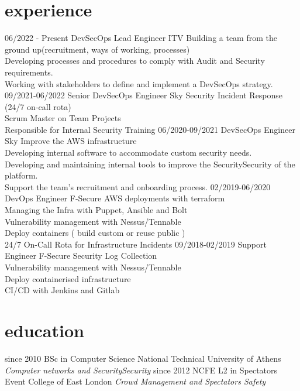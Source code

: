 \documentclass[]{twentysecondcv}
\begin{document}
\section{experience}
\begin{twenty}
  \twentyitem
    {06/2022 - Present}
    {DevSecOps Lead Engineer}
    {ITV}
    {Building a team from the ground up(recruitment, ways of working, processes)\\
    Developing processes and procedures to comply with Audit and Security requirements.\\
    Working with stakeholders to define and implement a DevSecOps strategy.    }
  \twentyitem
    {09/2021-06/2022}
    {Senior DevSecOps Engineer}
    {Sky}
    {Security Incident Response (24/7 on-call rota)\\
    Scrum Master on Team Projects\\
    Responsible for Internal Security Training    }
  \twentyitem
    {06/2020-09/2021}
    {DevSecOps Engineer}
    {Sky}
    {    Improve the AWS infrastructure\\
    Developing internal software to accommodate custom security needs.\\
    Developing and maintaining internal tools to improve the SecuritySecurity of the platform.\\
    Support the team's recruitment and onboarding process.
    }
  \twentyitem
    {02/2019-06/2020}
    {DevOps Engineer}
    {F-Secure}
    {AWS deployments with terraform\\
    Managing the Infra with Puppet, Ansible and Bolt\\
    Vulnerability management with Nessus/Tennable\\
    Deploy containers ( build custom or reuse public )\\
    24/7 On-Call Rota for Infrastructure Incidents}
  \twentyitem
    {09/2018-02/2019}
    {Support Engineer}
    {F-Secure}
    {Security Log Collection\\
    Vulnerability management with Nessus/Tennable\\
    Deploy containerised infrastructure\\
    CI/CD with Jenkins and Gitlab}


\end{twenty}

\section{education}
\begin{twenty}
  \twentyitem
    {since 2010}
    {BSc {\normalfont in Computer Science}}
    {National Technical University of Athens }
    {\emph{Computer networks and SecuritySecurity}}
  \twentyitem
    {since 2012}
    {NCFE L2 {\normalfont in Spectators Event}}
    {College of East London}
    {\emph{Crowd Management and Spectators Safety}}

\end{twenty}
\end{document}
